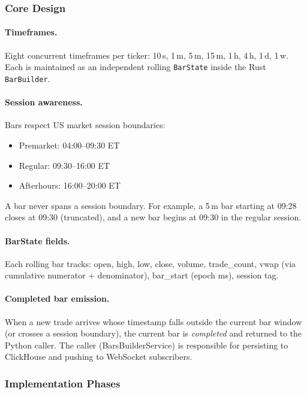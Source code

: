 \documentclass[a4paper, 11pt]{article}
\begin{document}
\subsubsection{Core Design}

\paragraph{Timeframes.}
Eight concurrent timeframes per ticker: 10\,s, 1\,m, 5\,m, 15\,m, 1\,h, 4\,h, 1\,d, 1\,w.
Each is maintained as an independent rolling \texttt{BarState} inside the Rust \texttt{BarBuilder}.

\paragraph{Session awareness.}
Bars respect US market session boundaries:
\begin{itemize}[nosep]
    \item Premarket: 04:00--09:30 ET
    \item Regular: 09:30--16:00 ET
    \item Afterhours: 16:00--20:00 ET
\end{itemize}
A bar never spans a session boundary. For example, a 5\,m bar starting at 09:28 closes
at 09:30 (truncated), and a new bar begins at 09:30 in the regular session.

\paragraph{BarState fields.}
Each rolling bar tracks: open, high, low, close, volume, trade\_count,
vwap (via cumulative numerator + denominator), bar\_start (epoch ms), session tag.

\paragraph{Completed bar emission.}
When a new trade arrives whose timestamp falls outside the current bar window (or crosses
a session boundary), the current bar is \emph{completed} and returned to the Python caller.
The caller (BarsBuilderService) is responsible for persisting to ClickHouse and pushing
to WebSocket subscribers.

\subsubsection{Implementation Phases}
\end{document}
